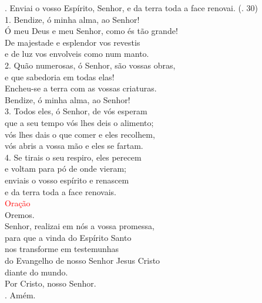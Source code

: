 \documentclass{book}
\begin{document}
\begin{flushleft}
    {\color{red} \Rbar.} Enviai o vosso Espírito, Senhor, e da terra toda a face renovai.
    \hspace{\fill}
    {\color{red} (\Rbar. 30)}
    \vspace{.1cm} \\
    1. Bendize, ó minha alma, ao Senhor! \\
    Ó meu Deus e meu Senhor, como és tão grande! \\
    De majestade e esplendor vos revestis \\
    e de luz vos envolveis como num manto.
    \vspace{.1cm} \\
    2. Quão numerosas, ó Senhor, são vossas obras, \\
    e que sabedoria em todas elas! \\
    Encheu-se a terra com as vossas criaturas. \\
    Bendize, ó minha alma, ao Senhor!
    \vspace{.1cm} \\
    3. Todos eles, ó Senhor, de vós esperam \\
    que a seu tempo vós lhes deis o alimento; \\
    vós lhes dais o que comer e eles recolhem, \\
    vós abris a vossa mão e eles se fartam.
    \vspace{.1cm} \\
    4. Se tirais o seu respiro, eles perecem \\
    e voltam para pó de onde vieram; \\
    enviais o vosso espírito e renascem \\
    e da terra toda a face renovais.
    \vspace{.2cm} \\
    \textcolor{red}{Oração}
    \vspace{.1cm} \\
    Oremos.
    \vspace{.1cm}\\
    Senhor, realizai em nós a vossa promessa, \\
    para que a vinda do Espírito Santo \\
    nos transforme em testemunhas \\
    do Evangelho de nosso Senhor Jesus Cristo \\
    diante do mundo. \\
    Por Cristo, nosso Senhor. \\
    {\color{red} \Rbar.} Amém.


\end{flushleft}
\end{document}
